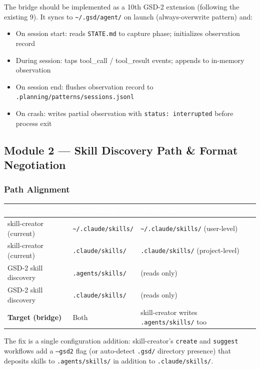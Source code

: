 \documentclass[11pt,letterpaper]{article}
\newcommand{\tableheader}[1]{\textbf{\sffamily\textcolor{white}{#1}}}
\begin{document}
The bridge should be implemented as a 10th GSD-2 extension (following the existing 9). It syncs to \texttt{\textasciitilde/.gsd/agent/} on launch (always-overwrite pattern) and:

\begin{itemize}
  \item On session start: reads \texttt{STATE.md} to capture phase; initializes observation record
  \item During session: taps tool\_call / tool\_result events; appends to in-memory observation
  \item On session end: flushes observation record to \texttt{.planning/patterns/sessions.jsonl}
  \item On crash: writes partial observation with \texttt{status: interrupted} before process exit
\end{itemize}

\subsection{Module 2 --- Skill Discovery Path \& Format Negotiation}

\subsubsection{Path Alignment}

\begin{center}
\begin{tabularx}{\textwidth}{L{4cm}L{3.5cm}X}
\toprule
{}
\tableheader{System} & \tableheader{Reads From} & \tableheader{Writes To} \\
\midrule
skill-creator (current) & \texttt{\textasciitilde/.claude/skills/} & \texttt{\textasciitilde/.claude/skills/} (user-level) \\
skill-creator (current) & \texttt{.claude/skills/} & \texttt{.claude/skills/} (project-level) \\
GSD-2 skill discovery & \texttt{.agents/skills/} & (reads only) \\
GSD-2 skill discovery & \texttt{.claude/skills/} & (reads only) \\
\textbf{Target (bridge)} & Both & skill-creator writes \texttt{.agents/skills/} too \\
\bottomrule
\end{tabularx}
\end{center}

The fix is a single configuration addition: skill-creator's \texttt{create} and \texttt{suggest} workflows add a \texttt{--gsd2} flag (or auto-detect \texttt{.gsd/} directory presence) that deposits skills to \texttt{.agents/skills/} in addition to \texttt{.claude/skills/}.
\end{document}

